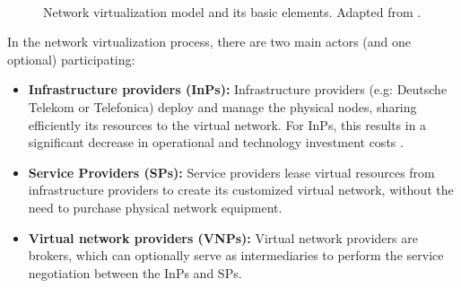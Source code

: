 \begin{figure}[bth]
	\myfloatalign
	 \quad
	 \\
	\caption{Network virtualization model and its basic elements. Adapted from \citep{carapinha2009network}.}
	\label{fig:networkvir}
\end{figure}

In the network virtualization process, there are two main actors (and one optional) participating:

\begin{itemize}
	
	\item \textbf{Infrastructure providers (InPs):} Infrastructure providers (e.g: Deutsche Telekom or Telefonica) deploy and manage the physical nodes, sharing efficiently its resources to the virtual network. For InPs, this results in a significant decrease in operational and technology investment costs \citep{dietrich2015multi}.
	\item \textbf{Service Providers (SPs):} Service providers lease virtual resources from infrastructure providers to create its customized virtual network, without the need to purchase physical network equipment.
		\item \textbf{Virtual network providers (VNPs):} Virtual network providers are brokers, which can optionally serve as intermediaries to perform the service negotiation between the InPs and SPs.
\end{itemize}


